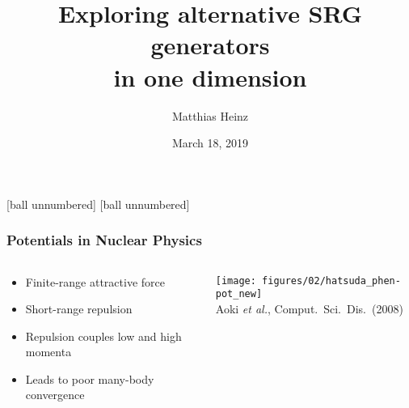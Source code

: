 \documentclass[accentcolor=tud2c,usenames,dvipsnames,colorbacktitle,inverttitle,landscape,german,presentation,t]{tudbeamer}
\begin{document}
  \title{Exploring alternative SRG generators \\ in one dimension}
  \author{Matthias Heinz}
  \date{March 18, 2019}

  [ball unnumbered]
  [ball unnumbered]



  \begin{frame}
    \frametitle{Potentials in Nuclear Physics}
    \begin{columns}[c]
      \begin{column}{0.6\textwidth}
        \begin{itemize}
          \item Finite-range attractive force
          \item Short-range repulsion
          \item Repulsion couples low and high momenta
          \item Leads to poor many-body convergence
        \end{itemize}
      \end{column}
      \begin{column}{0.4\textwidth}
        \begin{center}
          \texttt{[image: figures/02/hatsuda\_phen-pot\_new]}
          \\ \footnotesize{Aoki \textit{et al.}, Comput.~Sci.~Dis.~(2008)}
        \end{center}
      \end{column}
    \end{columns}
  \end{frame}
\end{document}
